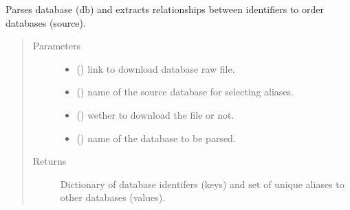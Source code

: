 \documentclass[letterpaper,10pt,english]{sphinxmanual}
\begin{document}
\begin{fulllineitems}
\label{\detokenize{_autosummary/graphdb_builder:graphdb_builder.mapping.getSTRINGMapping}}
Parses database (db) and extracts relationships between identifiers to order databases (source).
\begin{quote}\begin{description}
\item[{Parameters}] \leavevmode\begin{itemize}
\item {} 
 () \textendash{} link to download database raw file.

\item {} 
 () \textendash{} name of the source database for selecting aliases.

\item {} 
 () \textendash{} wether to download the file or not.

\item {} 
 () \textendash{} name of the database to be parsed.

\end{itemize}

\item[{Returns}] \leavevmode
Dictionary of database identifers (keys) and set of unique aliases to other databases (values).

\end{description}\end{quote}

\end{fulllineitems}

\end{document}
